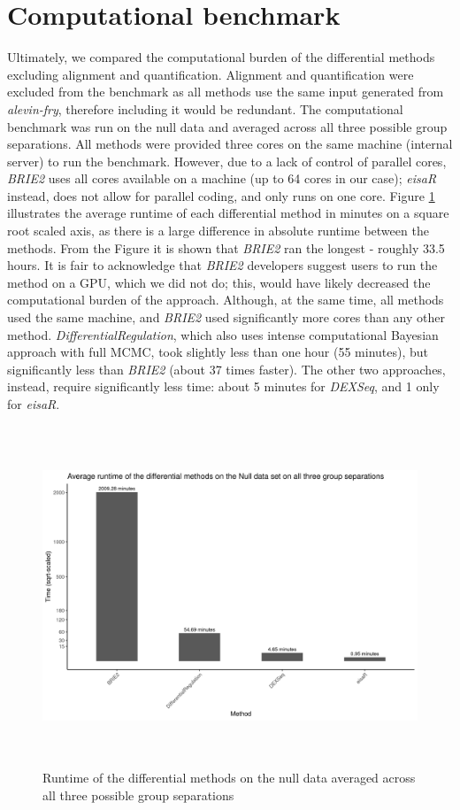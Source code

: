 \section{Computational benchmark}
Ultimately, we compared the computational burden of the differential methods excluding alignment and quantification. Alignment and quantification were excluded from the benchmark as all methods use the same input generated from \emph{alevin-fry}, therefore including it would be redundant. The computational benchmark was run on the null data and averaged across all three possible group separations. All methods were provided three cores on the same machine (internal server) to run the benchmark. However, due to a lack of control of parallel cores, \emph{BRIE2} uses all cores available on a machine (up to 64 cores in our case); \emph{eisaR} instead, does not allow for parallel coding, and only runs on one core. Figure \ref{fig:bench_mark} illustrates the average runtime of each differential method in minutes on a square root scaled axis, as there is a large difference in absolute runtime between the methods. From the Figure it is shown that \emph{BRIE2} ran the longest - roughly 33.5 hours. It is fair to acknowledge that \emph{BRIE2} developers suggest users to run the method on a GPU, which we did not do; this, would have likely decreased the computational burden of the approach. Although, at the same time, all methods used the same machine, and \emph{BRIE2} used significantly more cores than any other method.
\emph{DifferentialRegulation}, which also uses intense computational Bayesian approach with full MCMC, took slightly less than one hour (55 minutes), but significantly less than \emph{BRIE2} (about 37 times faster). The other two approaches, instead, require significantly less time: about 5 minutes for \emph{DEXSeq}, and 1 only for \emph{eisaR}.

\begin{figure}[!htb]
\begin{center}
\includegraphics[width=6in,height=4in]{../figures/null_analysis/bench_mark.png}
\end{center}
\caption{Runtime of the differential methods on the null data averaged across all three possible group separations}
\label{fig:bench_mark}
\end{figure}
\FloatBarrier

